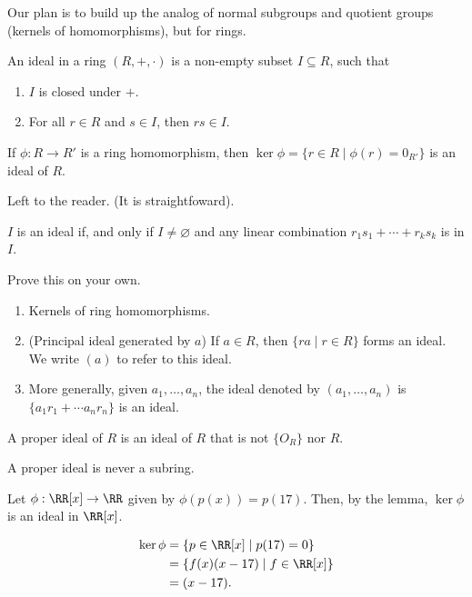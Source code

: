 
Our plan is to build up the analog of normal subgroups and quotient groups (kernels of homomorphisms), but for rings.

\begin{defn}
	An ideal in a ring $(R, +, \cdot)$ is a non-empty subset  $I \subseteq R$, such that
	\begin{enumerate} 
		\item $I$ is closed under $+$.
		\item  For all $r \in R$ and $s \in I$, then $rs \in I$.
	\end{enumerate}
\end{defn}

\begin{lem}
	If $\phi: R \to R'$ is a ring homomorphism, then $\ker\phi = \{r \in R \mid \phi(r) = 0_{R'}\}$ is an ideal of  $R$.
\end{lem}
\begin{dem}
	Left to the reader. (It is straightfoward).
\end{dem}

\begin{lem}
	$I$ is an ideal if, and only if $I \neq \varnothing$ and any linear combination $r_1s_1 + \cdots + r_ks_k$ is in  $I$.
\end{lem}

Prove this on your own.

\begin{exmp}
	\begin{enumerate}
		\item Kernels of ring homomorphisms.
		\item (Principal ideal generated by $a$) If $a \in R$, then $\{ra \mid r \in R\}$ forms an ideal. We write $(a)$ to refer to this ideal.
		\item More generally, given $a_1, \dots, a_n$, the ideal denoted by $(a_1, \dots, a_n)$ is $\{a_1r_1 + \cdots a_nr_n\}$ is an ideal.
	\end{enumerate}
\end{exmp}

\begin{defn}
	A proper ideal of $R$ is an ideal of $R$ that is not $\{O_R\}$ nor $R$.
\end{defn}

\begin{lem}
	A proper ideal is never a subring.
\end{lem}

\begin{exmp}
	Let $\phi: \RR[x] \to \RR$ given by $\phi(p(x)) = p(17)$.
	Then, by the lemma,  $\ker\phi$ is an ideal in $\RR[x]$.

	\begin{align*}
		\ker\phi &= \{p \in \RR[x] \mid p(17) = 0\}\\
				 &= \{f(x)(x-17) \mid f \in \RR[x]\}\\
				 &= (x - 17).
	\end{align*}
\end{exmp}

